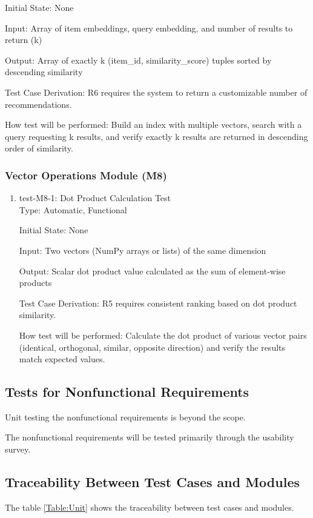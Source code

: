 \documentclass[12pt, titlepage]{article}
\begin{document}
\begin{enumerate}
  Initial State: None
  
  Input: Array of item embeddings, query embedding, and number of results to return (k)
  
  Output: Array of exactly k (item\_id, similarity\_score) tuples sorted by descending similarity
  
  Test Case Derivation: R6 requires the system to return a customizable number of recommendations.
  
  How test will be performed: Build an index with multiple vectors, search with a query requesting k results, and verify exactly k results are returned in descending order of similarity.
  \end{enumerate}

\subsubsection{Vector Operations Module (M8)}

\begin{enumerate}

  \item{test-M8-1: Dot Product Calculation Test\\}
  Type: Automatic, Functional
            
  Initial State: None
            
  Input: Two vectors (NumPy arrays or lists) of the same dimension
            
  Output: Scalar dot product value calculated as the sum of element-wise products
  
  Test Case Derivation: R5 requires consistent ranking based on dot product similarity.
  
  How test will be performed: Calculate the dot product of various vector pairs (identical, orthogonal, similar, opposite direction) and verify the results match expected values.

\end{enumerate}


\subsection{Tests for Nonfunctional Requirements}

Unit testing the nonfunctional requirements is beyond the scope. 

The nonfunctional requirements will be tested primarily through the usability survey.


\subsection{Traceability Between Test Cases and Modules}
The table \ref{Table:Unit} shows the traceability between test cases and modules.
\end{document}
